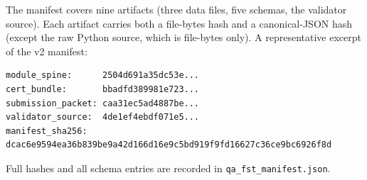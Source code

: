 \documentclass[12pt,a4paper]{article}
\begin{document}
The manifest covers nine artifacts (three data files, five schemas,
the validator source). Each artifact carries both a file-bytes hash
and a canonical-JSON hash (except the raw Python source, which is
file-bytes only). A representative excerpt of the v2 manifest:

\begin{lstlisting}
module_spine:      2504d691a35dc53e...
cert_bundle:       bbadfd389981e723...
submission_packet: caa31ec5ad4887be...
validator_source:  4de1ef4ebdf071e5...
manifest_sha256:   dcac6e9594ea36b839be9a42d166d16e9c5bd919f9fd16627c36ce9bc6926f8d
\end{lstlisting}

Full hashes and all schema entries are recorded in
\texttt{qa\_fst\_manifest.json}.
\end{document}
